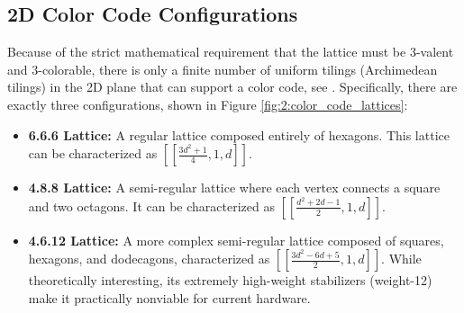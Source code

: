 \subsection{2D Color Code Configurations}
 Because of the strict mathematical requirement that the lattice must be 3-valent and 3-colorable, there is only a finite number of uniform tilings (Archimedean tilings) in the 2D plane that can support a color code, see \cite{landahl2011fault}. Specifically, there are exactly three configurations, shown in Figure \ref{fig:2:color_code_lattices}:

\begin{itemize}
    \item \textbf{6.6.6 Lattice:} A regular lattice composed entirely of hexagons. This lattice can be characterized as $\left[\left[ \frac{3d^2 + 1}{4}, 1, d \right]\right]$.
    \item \textbf{4.8.8 Lattice:} A semi-regular lattice where each vertex connects a square and two octagons. It can be characterized as $\left[\left[ \frac{d^2 + 2d - 1}{2}, 1, d \right]\right]$.
    \item \textbf{4.6.12 Lattice:} A more complex semi-regular lattice composed of squares, hexagons, and dodecagons, characterized as $\left[\left[ \frac{3d^2 - 6d + 5}{2}, 1, d \right]\right]$. While theoretically interesting, its extremely high-weight stabilizers (weight-12) make it practically nonviable for current hardware.
\end{itemize}

